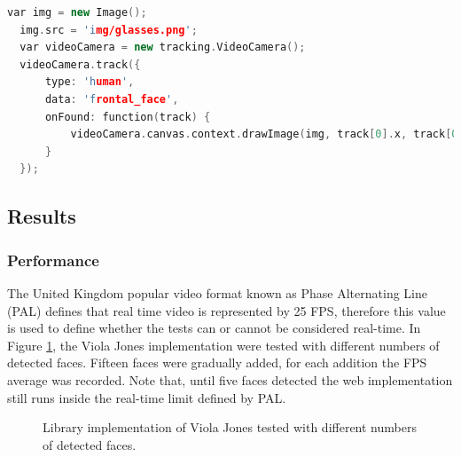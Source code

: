 \newpage

\begin{lstlisting}[language=C++,label={lst:viola},caption=Example of \textit{tracking.js} API of augmenting users faces with objects using Viola Jones face detection.]
  var img = new Image();
  img.src = 'img/glasses.png';
  var videoCamera = new tracking.VideoCamera();
  videoCamera.track({
      type: 'human',
      data: 'frontal_face',
      onFound: function(track) {
          videoCamera.canvas.context.drawImage(img, track[0].x, track[0].y, track[0].size, track[0].size);
      }
  });
\end{lstlisting}


\subsection{Results} %
\label{sub:evaluation:rapid_object_detection:results}

\subsubsection{Performance} %
\label{subsub:evaluation:rapid_object_detection:results:performance}

The United Kingdom popular video format known as Phase Alternating Line (PAL) \cite{PAL1962} defines that real time video is represented by 25 FPS, therefore this value is used to define whether the tests can or cannot be considered real-time. In Figure \ref{figure:viola_fps}, the Viola Jones implementation were tested with different numbers of detected faces. Fifteen faces were gradually added, for each addition the FPS average was recorded. Note that, until five faces detected the web implementation still runs inside the real-time limit defined by PAL.

\begin{figure}[!htb]
  \centering
   \caption{Library implementation of Viola Jones tested with different numbers of detected faces.}
   \label{figure:viola_fps}
\end{figure}


